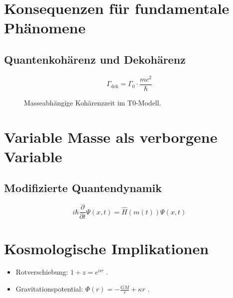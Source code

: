 \documentclass[12pt,a4paper]{article}
\begin{document}
	\section{Konsequenzen für fundamentale Phänomene}
	\subsection{Quantenkohärenz und Dekohärenz}
	\begin{equation}
		\Gamma_{\text{dek}} = \Gamma_0 \cdot \frac{mc^2}{\hbar}
	\end{equation}
	
	\begin{figure}[h]
		\centering
		\caption{Masseabhängige Kohärenzzeit im T0-Modell.}
	\end{figure}
	
	\section{Variable Masse als verborgene Variable}
	\subsection{Modifizierte Quantendynamik}
	\begin{equation}
		i\hbar \frac{\partial}{\partial t}\Psi(x,t) = \hat{H}(m(t))\Psi(x,t)
	\end{equation}
	
	\section{Kosmologische Implikationen}
	\begin{itemize}
		\item Rotverschiebung: \(1 + z = e^{\alpha r}\) \cite{pascher_wesentl_2025}.
		\item Gravitationspotential: \(\Phi(r) = -\frac{GM}{r} + \kappa r\) \cite{pascher_wesentl_2025}.
	\end{itemize}
	
\end{document}
